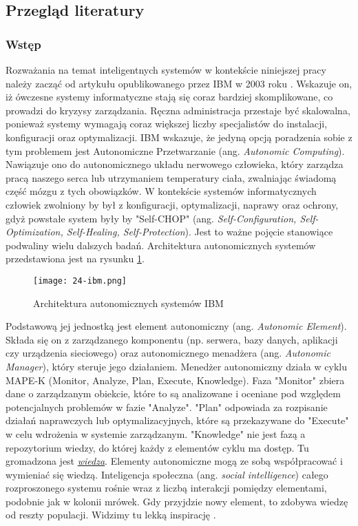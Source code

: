 \subsection{Przegląd literatury}
\subsubsection{Wstęp}
Rozważania na temat inteligentnych systemów w kontekście niniejszej pracy należy zacząć od artykułu opublikowanego przez IBM w 2003 roku \cite{kephart2003}. Wskazuje on, iż ówczesne systemy informatyczne stają się coraz bardziej skomplikowane, co prowadzi do kryzysy zarządzania. Ręczna administracja przestaje być skalowalna, ponieważ systemy wymagają coraz większej liczby specjalistów do instalacji, konfiguracji oraz optymalizacji. IBM wskazuje, że jedyną opcją poradzenia sobie z tym problemem jest Autonomiczne Przetwarzanie (ang. \textit{Autonomic Computing}). Nawiązuje ono do autonomicznego układu nerwowego człowieka, który zarządza pracą naszego serca lub utrzymaniem temperatury ciała, zwalniając świadomą część mózgu z tych obowiązków. W kontekście systemów informatycznych człowiek zwolniony by był z konfiguracji, optymalizacji, naprawy oraz ochrony, gdyż powstałe system były by "Self-CHOP" (ang. \textit{Self-Configuration, Self-Optimization, Self-Healing, Self-Protection}). Jest to ważne pojęcie stanowiące podwaliny wielu dalszych badań. Architektura autonomicznych systemów przedstawiona jest na rysunku \ref{fig:24-ibm}.

\begin{figure}[!htbp]
    \centering \texttt{[image: 24-ibm.png]}
    \caption{Architektura autonomicznych systemów IBM}\label{fig:24-ibm}
\end{figure}

Podstawową jej jednostką jest element autonomiczny (ang. \textit{Autonomic Element}). Składa się on z zarządzanego komponentu (np. serwera, bazy danych, aplikacji czy urządzenia sieciowego) oraz autonomicznego menadżera (ang. \textit{Autonomic Manager}), który steruje jego działaniem. Menedżer autonomiczny działa w cyklu MAPE-K (Monitor, Analyze, Plan, Execute, Knowledge). Faza "Monitor" zbiera dane o zarządzanym obiekcie, które to są analizowane i oceniane pod względem potencjalnych problemów w fazie "Analyze". "Plan" odpowiada za rozpisanie działań naprawczych lub optymalizacyjnych, które są przekazywane do "Execute" w celu wdrożenia w systemie zarządzanym. "Knowledge" nie jest fazą a repozytorium wiedzy, do której każdy z elementów cyklu ma dostęp. Tu gromadzona jest \hyperlink{def:wiedza}{\textit{wiedza}}. Elementy autonomiczne mogą ze sobą współpracować i wymieniać się wiedzą. Inteligencja społeczna (ang. \textit{social intelligence}) całego rozproszonego systemu rośnie wraz z liczbą interakcji pomiędzy elementami, podobnie jak w kolonii mrówek. Gdy przyjdzie nowy element, to zdobywa wiedzę od reszty populacji. Widzimy tu lekką inspirację \cite{minsky1986}.

